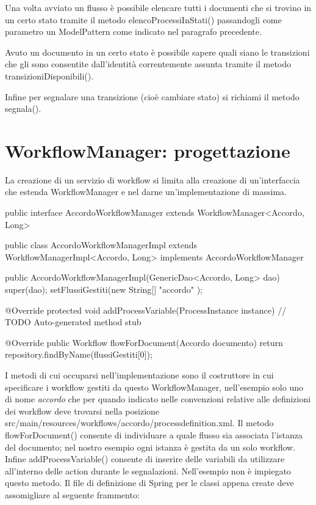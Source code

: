 Una volta avviato un flusso è possibile elencare tutti i documenti che si trovino in un certo stato tramite il metodo  elencoProcessiInStati() passandogli come parametro un ModelPattern come indicato nel paragrafo precedente.

Avuto un documento in un certo stato è possibile sapere quali siano le transizioni che gli sono consentite dall'identità correntemente assunta tramite il metodo  transizioniDisponibili().

Infine per segnalare una transizione (cioè cambiare stato) si richiami il metodo  segnala().


\section{WorkflowManager: progettazione}

La creazione di un servizio di workflow si limita alla creazione di un'interfaccia che estenda WorkflowManager e nel darne un'implementazione di massima.

\begin{java}

public interface AccordoWorkflowManager 
 extends WorkflowManager<Accordo, Long> {
}

public class AccordoWorkflowManagerImpl 
extends WorkflowManagerImpl<Accordo, Long> 
implements AccordoWorkflowManager 
{

  public AccordoWorkflowManagerImpl(GenericDao<Accordo, Long> dao) {
    super(dao);
    setFlussiGestiti(new String[] { "accordo" });
  }

  @Override
  protected void addProcessVariable(ProcessInstance instance) {
    // TODO Auto-generated method stub
  }

  @Override
  public Workflow flowForDocument(Accordo documento) {
    return repository.findByName(flussiGestiti[0]);
  }
  
}

\end{java}


I metodi di cui occuparsi nell'implementazione sono il costruttore in cui specificare i workflow gestiti da questo WorkflowManager, nell'esempio solo uno di nome \textit{accordo} che per quando indicato nelle convenzioni relative alle definizioni dei workflow deve trovarsi nella posizione src/main/resources/workflows/accordo/processdefinition.xml.
Il metodo flowForDocument() consente di individuare a quale flusso sia associata l'istanza del documento; nel nostro esempio ogni istanza è gestita da un solo workflow.
Infine addProcessVariable() consente di inserire delle variabili da utilizzare all'interno delle action durante le segnalazioni. Nell'esempio non è impiegato questo metodo.
Il file di definizione di Spring per le classi appena create deve assomigliare al seguente frammento:


